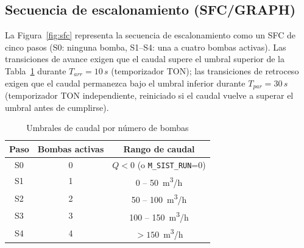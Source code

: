 \documentclass[conference]{IEEEtran}
\begin{document}
\subsection{Secuencia de escalonamiento (SFC/GRAPH)}
\label{sec:sfc}

La Figura~\ref{fig:sfc} representa la secuencia de escalonamiento como un SFC de cinco pasos (S0: ninguna bomba, S1--S4: una a cuatro bombas activas). Las transiciones de avance exigen que el caudal supere el umbral superior de la Tabla~\ref{tab:umbrales} durante $T_{arr}=10\,\si{s}$ (temporizador TON); las transiciones de retroceso exigen que el caudal permanezca bajo el umbral inferior durante $T_{par}=30\,\si{s}$ (temporizador TON independiente, reiniciado si el caudal vuelve a superar el umbral antes de cumplirse).

\begin{table}[H]
\centering
\caption{Umbrales de caudal por número de bombas}
\label{tab:umbrales}
\renewcommand{\arraystretch}{1.2}
\begin{tabular}{|c|c|c|}
\hline
\textbf{Paso} & \textbf{Bombas activas} & \textbf{Rango de caudal} \\
\hline
S0 & 0 & $Q{<}0$ (o \texttt{M\_SIST\_RUN}=0) \\ \hline
S1 & 1 & 0 -- 50~\si{m^3/h} \\ \hline
S2 & 2 & 50 -- 100~\si{m^3/h} \\ \hline
S3 & 3 & 100 -- 150~\si{m^3/h} \\ \hline
S4 & 4 & ${>}150$~\si{m^3/h} \\ \hline
\end{tabular}
\end{table}
\end{document}
